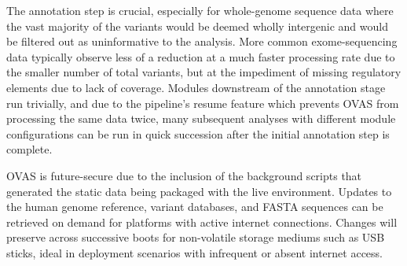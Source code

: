 \documentclass[twocolumn]{bmcart}%
\def\app{OVAS}
\begin{document}
The annotation step is crucial, especially for whole-genome sequence data where the vast majority of the variants would be deemed wholly intergenic and would be filtered out as uninformative to the analysis. More common exome-sequencing data typically observe less of a reduction at a much faster processing rate due to the smaller number of total variants, but at the impediment of missing regulatory elements due to lack of coverage. Modules downstream of the annotation stage run trivially, and due to the pipeline's resume feature which prevents \app{} from processing the same data twice, many subsequent analyses with different module configurations can be run in quick succession after the initial annotation step is complete.

\app{} is future-secure due to the inclusion of the background scripts that generated the static data being packaged with the live environment. Updates to the human genome reference, variant databases, and FASTA sequences can be retrieved on demand for platforms with active internet connections. Changes will preserve across successive boots for non-volatile storage mediums such as USB sticks, ideal in deployment scenarios with infrequent or absent internet access.


\end{document}
